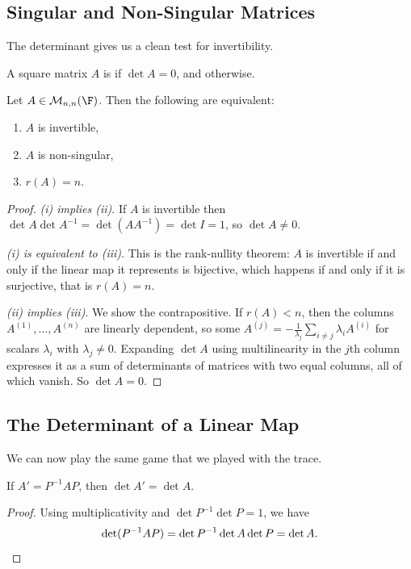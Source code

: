 \subsection{Singular and Non-Singular Matrices}

The determinant gives us a clean test for invertibility.

\begin{definition}
    A square matrix $A$ is  if $\det A = 0$, and  otherwise.
\end{definition}

\begin{theorem}
    Let $A \in \mathcal{M}_{n,n}(\F)$. Then the following are equivalent:
    \begin{enumerate}[label=(\roman*)]
        \item $A$ is invertible,
        \item $A$ is non-singular,
        \item $r(A) = n$.
    \end{enumerate}
\end{theorem}
\begin{proof}
    \emph{(i) implies (ii)}. If $A$ is invertible then $\det A \det A^{-1} = \det (AA^{-1}) = \det I = 1$, so $\det A \neq 0$.

    \emph{(i) is equivalent to (iii)}. This is the rank-nullity theorem: $A$ is invertible if and only if the linear map it represents is bijective, which happens if and only if it is surjective, that is $r(A) = n$.

    \emph{(ii) implies (iii)}. We show the contrapositive. If $r(A) < n$, then the columns $A^{(1)}, \dots, A^{(n)}$ are linearly dependent, so some $A^{(j)} = -\frac{1}{\lambda_j}\sum_{i \neq j} \lambda_i A^{(i)}$ for scalars $\lambda_i$ with $\lambda_j \neq 0$. Expanding $\det A$ using multilinearity in the $j$th column expresses it as a sum of determinants of matrices with two equal columns, all of which vanish. So $\det A = 0$.
\end{proof}

\subsection{The Determinant of a Linear Map}

We can now play the same game that we played with the trace.

\begin{lemma}
    If $A' = P^{-1} A P$, then $\det A' = \det A$.
\end{lemma}
\begin{proof}
    Using multiplicativity and $\det P^{-1}\det P = 1$, we have
    $$
    \det (P^{-1}AP) = \det P^{-1} \det A \det P = \det A. \qedhere
    $$
\end{proof}

